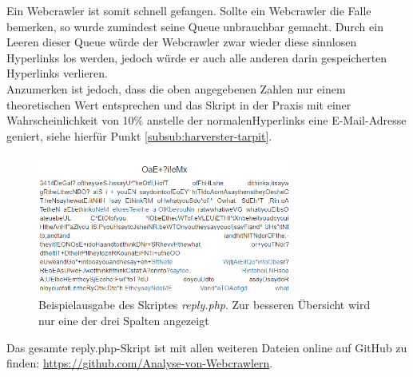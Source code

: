 Ein Webcrawler ist somit schnell gefangen. Sollte ein Webcrawler die Falle bemerken, so wurde zumindest seine Queue unbrauchbar gemacht. Durch ein Leeren dieser Queue würde der Webcrawler zwar wieder diese sinnlosen Hyperlinks los werden, jedoch würde er auch alle anderen darin gespeicherten Hyperlinks verlieren.\\
Anzumerken ist jedoch, dass die oben angegebenen Zahlen nur einem theoretischen Wert entsprechen und das Skript in der Praxis mit einer Wahrscheinlichkeit von 10\% anstelle der \glqq normalen\grqq\space Hyperlinks eine E-Mail-Adresse geniert, siehe hierfür Punkt \ref{subsub:harverster-tarpit}.\\
\begin{figure}[H]
	\centering
	\includegraphics[width=8.45cm]{img/beispiel-hyperlink1.PNG}
	\caption{Beispielausgabe des Skriptes \emph{reply.php}. Zur besseren Übersicht wird nur eine der drei Spalten angezeigt}
	\label{fig:beispiel-hyperlink}
\end{figure}
Das gesamte reply.php-Skript ist mit allen weiteren Dateien online auf GitHub zu finden: \url{https://github.com/Analyse-von-Webcrawlern}.
\label{subsub:hyperlink-tarpit}

